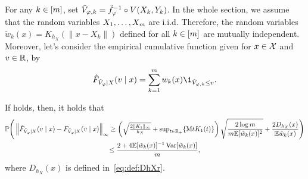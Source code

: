 
For any $k\in[m]$, set $\tilde{V}_{\varphi,k}=\tilde{f}_{\varphi}^{-1}\circ V(X_{k},Y_{k})$. In the whole section, we assume that the random variables $X_1,\ldots,X_{m}$ are i.i.d.
Therefore, the random variables $\tilde{w}_{k}(x) = K_{h_{X}}(\|x-X_{k}\|)$ defined for all $k\in[m]$ are mutually independent. 
Moreover, let's consider the empirical cumulative function given for $x\in\mathcal{X}$ and $v\in\mathbb{R}$, by
\begin{equation*}
  \hat{F}_{\tilde{V}_{\varphi}\mid X}(v\mid x)
  = \sum_{k=1}^{\ccount} w_{k}(x) \1_{\tilde{V}_{\varphi,k}\le v}.
\end{equation*}

\begin{theorem}\label{thm:uniform-cdf}
  If  holds, then, it holds that
  \begin{multline*}
    \mathbb{P}\Bigg( \left\|{\hat{F}_{\tilde{V}_{\varphi}\mid X}(v\mid x) - F_{\tilde{V}_{\varphi}\mid X}(v\mid x)}\right\|_{\infty}
    \ge \left({ \textstyle \sqrt{\frac{2\|{K_{1}}\|_{\infty}}{ h_{X} }} + \sup_{t\in\mathbb{R}_+}\{{\mathrm{M} t K_{1}(t)}\}}\right) \sqrt{\frac{ 2 \log m }{ m \mathbb{E}[\tilde{w}_k(x)]^2 }}
    + \frac{2 D_{h_X}(x)}{\mathbb{E} \tilde{w}_k(x)}
    \Bigg)
    \\
    \le \frac{2 + 4 \mathbb{E}[\tilde{w}_k(x)]^{-1} \operatorname{Var}[\tilde{w}_k(x)]}{m}
    ,
  \end{multline*}
  where $D_{h_X}(x)$ is defined in~\eqref{eq:def:DhXr}.
\end{theorem}

